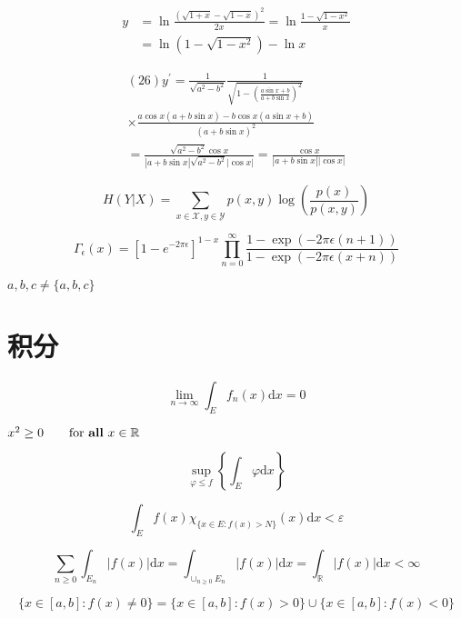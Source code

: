 \documentclass{article}
\begin{document}
    \[
    \begin{aligned} y &=\ln \frac{(\sqrt{1+x}-\sqrt{1-x})^{2}}{2 x}=\ln \frac{1-\sqrt{1-x^{2}}}{x} \\ &=\ln (1-\sqrt{1-x^{2}})-\ln x \end{aligned}
    \]


    \[
    \begin{array}{l}{(26) y^{\prime}=\frac{1}{\sqrt{a^{2}-b^{2}}} \frac{1}{\sqrt{1-\left(\frac{a \sin x+b}{a+b \sin x}\right)^{2}}}} \\ {\times \frac{a \cos x(a+b \sin x)-b \cos x(a \sin x+b)}{(a+b \sin x)^{2}}} \\ {=\frac{\sqrt{a^{2}-b^{2}} \cos x}{|a+b \sin x| \sqrt{a^{2}-b^{2}}|\cos x|}=\frac{\cos x}{|a+b \sin x||\cos x|}}\end{array}
    \]

    \[
    H(Y | X)=\sum_{x \in \mathcal{X}, y \in \mathcal{Y}} p(x, y) \log \left(\frac{p(x)}{p(x, y)}\right)
    \]

    \[
    \Gamma_{\epsilon}(x)=\left[1-e^{-2 \pi \epsilon}\right]^{1-x} \prod_{n=0}^{\infty} \frac{1-\exp (-2 \pi \epsilon(n+1))}{1-\exp (-2 \pi \epsilon(x+n))}
    \]

    ${a,b,c}\neq \{a,b,c\}$ %

\section{积分}
    \[
    \lim _{n \rightarrow \infty} \int_{E} f_{n}(x) \mathrm{d} x=0
    \]

    $x^{2} \geq 0 \qquad
    \text{for \textbf{all} }
    x\in\mathbb{R}$

    \[
    \sup _{\varphi \leq f}\left\{\int_{E} \varphi \mathrm{d} x\right\}
    \]

    \[
    \int_{E} f(x) \chi_{\{x \in E: f(x)>N\}}(x) \mathrm{d} x<\varepsilon
    \]

    \[
    \sum_{n \geq 0} \int_{E_{n}}|f(x)| \mathrm{d} x=\int_{\cup_{n \geq 0} E_{n}}|f(x)| \mathrm{d} x=\int_{\mathbb{R}}|f(x)| \mathrm{d} x<\infty
    \]
    
    \[
    \{x \in[a, b]: f(x) \neq 0\}=\{x \in[a, b]: f(x)>0\} \cup\{x \in[a, b]: f(x)<0\}
    \]
\end{document}
